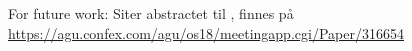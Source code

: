 \begin{framed}
    For future work: Siter abstractet til \parencite{haller2018material},
    finnes på \url{https://agu.confex.com/agu/os18/meetingapp.cgi/Paper/316654}
\end{framed}
